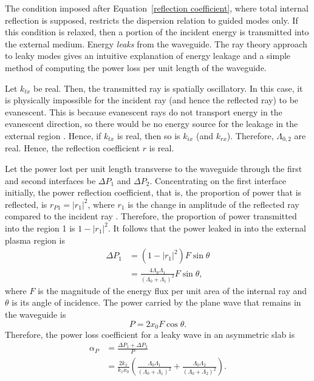 	The condition imposed after Equation~\eqref{reflection coefficient}, where total internal reflection is supposed, restricts the dispersion relation to guided modes only. If this condition is relaxed, then a portion of the incident energy is transmitted into the external medium. Energy \textit{leaks} from the waveguide. The ray theory approach to leaky modes gives an intuitive explanation of energy leakage and a simple method of computing the power loss per unit length of the waveguide.
	
	Let $k_{tx}$ be real. Then, the transmitted ray is spatially oscillatory. In this case, it is physically impossible for the incident ray (and hence the reflected ray) to be evanescent. This is because evanescent rays do not transport energy in the evanescent direction, so there would be no energy source for the leakage in the external region \citep{goe_etal04}. Hence, if $k_{tx}$ is real, then so is $k_{ix}$ (and $k_{rx}$). Therefore, $\Lambda_{0, 2}$ are real. Hence, the reflection coefficient $r$ is real.
	
	Let the power lost per unit length transverse to the waveguide through the first and second interfaces be $\Delta P_1$ and $\Delta P_2$. Concentrating on the first interface initially, the power reflection coefficient, that is, the proportion of power that is reflected, is $r_{P1} = |r_1|^2$, where $r_1$ is the change in amplitude of the reflected ray compared to the incident ray \citep{mar74}. Therefore, the proportion of power transmitted into the region 1 is $1 - |r_1|^2$. It follows that the power leaked in into the external plasma region is
	\begin{align}
	\Delta P_1 &= (1 - |r_1|^2)F\sin{\theta} \\
	&= \frac{4\Lambda_0\Lambda_1}{(\Lambda_0 + \Lambda_1)^2}F\sin{\theta},
	\end{align}
	where $F$ is the magnitude of the energy flux per unit area of the internal ray and $\theta$ is its angle of incidence. The power carried by the plane wave that remains in the waveguide is
	\begin{equation}
	P = 2x_0F\cos{\theta}.
	\end{equation}
	Therefore, the power loss coefficient for a leaky wave in an asymmetric slab is
	\begin{align}
	\alpha_P &= \frac{\Delta P_1 + \Delta P_2}{P} \\
	&= \frac{2k_x}{k_zx_0}\left( \frac{\Lambda_0\Lambda_1}{(\Lambda_0 + \Lambda_1)^2} + \frac{\Lambda_0\Lambda_2}{(\Lambda_0 + \Lambda_2)^2} \right).
	\end{align}
	
